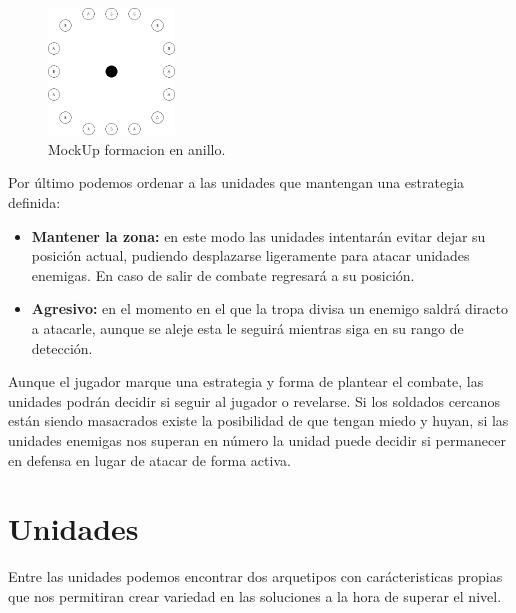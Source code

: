 \begin{figure}[ht]
\centering
\includegraphics[width=0.3\textwidth]{imagenes/gdd/Formacion-anillo.png}
\caption{MockUp formacion en anillo.}
\label{mockup_anillo}
\end{figure}


Por último podemos ordenar a las unidades que mantengan una estrategia definida:

\begin{itemize}
\item \textbf{Mantener la zona:} en este modo las unidades intentarán evitar dejar su posición
actual, pudiendo desplazarse ligeramente para atacar unidades enemigas. En caso de salir de combate
regresará a su posición.

\item \textbf{Agresivo:} en el momento en el que la tropa divisa un enemigo saldrá diracto a atacarle,
aunque se aleje esta le seguirá mientras siga en su rango de detección.
\end{itemize} 

Aunque el jugador marque una estrategia y forma de plantear el combate, las unidades podrán
decidir si seguir al jugador o revelarse. Si los soldados cercanos están siendo masacrados
existe la posibilidad de que tengan miedo y huyan, si las unidades enemigas nos superan en número
la unidad puede decidir si permanecer en defensa en lugar de atacar de forma activa.

\section{Unidades}
Entre las unidades podemos encontrar dos arquetipos con carácteristicas propias
que nos permitiran crear variedad en las soluciones a la hora de superar el
nivel.

